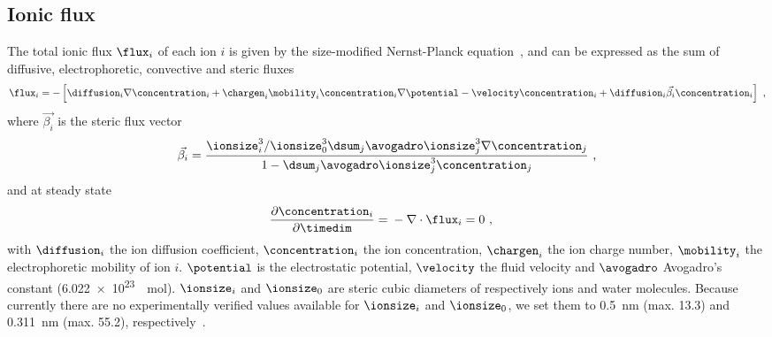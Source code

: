 \subsection{Ionic flux}
%

The total ionic flux $\flux_{i}$ of each ion $i$ is given by the size-modified Nernst-Planck
equation~\cite{Lu-2011}, and can be expressed as the sum of diffusive, electrophoretic, convective and steric
fluxes
%
\begin{align}
  \label{eq:sm-nernst-planck}
  \flux_{i} = -\left[
    \diffusion_{i} \nabla \concentration_{i}
    + \chargen_{i} \mobility_{i} \concentration_{i} \nabla \potential
    - \velocity \concentration_{i}
    + \diffusion_{i} \vec{\beta_{i}} \concentration_{i} \right]
  \text{ ,}
\end{align}
%
where $\vec{\beta_{i}}$ is the steric flux vector
%
\begin{align}\label{eq:epnp-ns_steric_flux_vector}
  \vec{\beta_{i}} =
      \frac{ \ionsize_{i}^3 / \ionsize_{0}^3 \dsum_{j} \avogadro \ionsize_{j}^3 \nabla \concentration_{j} }
          { 1 - \dsum_{j} \avogadro \ionsize_{j}^3 \concentration_{j} }
  \text{ ,}
\end{align}
%
and at steady state
%
\begin{align}
  \dfrac{\partial \concentration_{i}}{\partial \timedim} ={}& - \nabla \cdot \flux_{i} = 0
  \text{ ,}
\end{align}
%
with $\diffusion_{i}$ the ion diffusion coefficient, $\concentration_{i}$ the ion concentration,
$\chargen_{i}$ the ion charge number, $\mobility_{i}$ the electrophoretic mobility of ion $i$. $\potential$ is
the electrostatic potential, $\velocity$ the fluid velocity and $\avogadro$ Avogadro's constant
(\SI{6.022e23}{\per\mole}). $\ionsize_{i}$ and $\ionsize_{0}$ are steric cubic diameters of respectively ions
and water molecules. Because currently there are no experimentally verified values available for
$\ionsize_{i}$ and $\ionsize_{0}$, we set them to \SI{0.5}{\nm} (max. \SI{13.3}{\Molar}) and \SI{0.311}{\nm}
(max. \SI{55.2}{\Molar}), respectively~\cite{Bazant-2009}.

